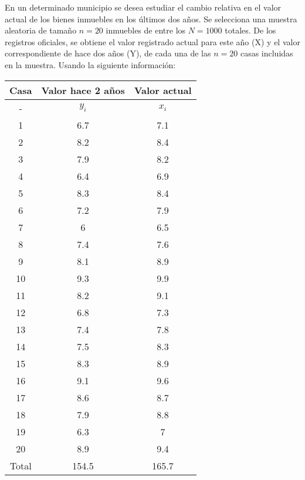 
\addpoints

\question[60] En un determinado municipio se desea estudiar el cambio relativa en el valor actual de los bienes inmuebles en los últimos dos años. Se selecciona una muestra aleatoria de tamaño $n=20$ inmuebles de entre los $N=1000$ totales. De los registros oficiales, se obtiene el valor registrado actual para este año (X) y el valor correspondiente de hace dos años (Y), de cada una de las $n=20$ casas incluidas en la muestra. Usando la siguiente información:

\begin{center}
\begin{tabular}{|c|c|c|}
\hline 
Casa & Valor hace 2 años & Valor actual \\ 
\hline 
- & $y_i$ & $x_i$ \\ 
\hline 
1 & 6.7 & 7.1 \\ 
\hline 
2  & 8.2 & 8.4 \\
\hline 
3  & 7.9 & 8.2 \\
\hline 
4  & 6.4 & 6.9 \\
\hline 
5  & 8.3 & 8.4 \\
\hline 
6  & 7.2 & 7.9 \\
\hline 
7  & 6   & 6.5 \\
\hline 
8  & 7.4 & 7.6 \\
\hline 
9  & 8.1 & 8.9 \\
\hline 
10 & 9.3 & 9.9 \\
\hline 
11 & 8.2 & 9.1 \\
\hline 
12 & 6.8 & 7.3 \\
\hline 
13 & 7.4 & 7.8 \\
\hline 
14 & 7.5 & 8.3 \\
\hline 
15 & 8.3 & 8.9 \\
\hline 
16 & 9.1 & 9.6 \\
\hline 
17 & 8.6 & 8.7 \\
\hline 
18 & 7.9 & 8.8 \\
\hline 
19 & 6.3 & 7   \\
\hline 
20 & 8.9 & 9.4 \\
\hline
Total & 154.5 & 165.7 \\ 
\hline 
\end{tabular} 
\end{center}

